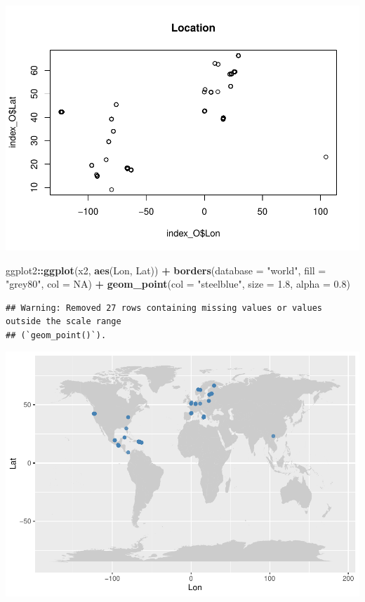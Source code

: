 \documentclass[
]{book}
\newenvironment{Shaded}{\begin{snugshade}}{\end{snugshade}}
\newcommand{\AttributeTok}[1]{\textcolor[rgb]{0.13,0.29,0.53}{#1}}
\newcommand{\ConstantTok}[1]{\textcolor[rgb]{0.56,0.35,0.01}{#1}}
\newcommand{\FloatTok}[1]{\textcolor[rgb]{0.00,0.00,0.81}{#1}}
\newcommand{\FunctionTok}[1]{\textcolor[rgb]{0.13,0.29,0.53}{\textbf{#1}}}
\newcommand{\NormalTok}[1]{#1}
\newcommand{\SpecialCharTok}[1]{\textcolor[rgb]{0.81,0.36,0.00}{\textbf{#1}}}
\newcommand{\StringTok}[1]{\textcolor[rgb]{0.31,0.60,0.02}{#1}}
\theoremstyle{definition}
\theoremstyle{definition}
\theoremstyle{definition}
\theoremstyle{definition}
\theoremstyle{remark}
\begin{document}
\includegraphics{Diagnostico_Poblacional_files/figure-latex/chap16_15-1.pdf}

\begin{Shaded}
\begin{Highlighting}[]
\NormalTok{ggplot2}\SpecialCharTok{::}\FunctionTok{ggplot}\NormalTok{(x2, }\FunctionTok{aes}\NormalTok{(Lon, Lat)) }\SpecialCharTok{+}
  \FunctionTok{borders}\NormalTok{(}\AttributeTok{database =} \StringTok{"world"}\NormalTok{, }\AttributeTok{fill =} \StringTok{"grey80"}\NormalTok{, }\AttributeTok{col =} \ConstantTok{NA}\NormalTok{) }\SpecialCharTok{+}
  \FunctionTok{geom\_point}\NormalTok{(}\AttributeTok{col =} \StringTok{"steelblue"}\NormalTok{, }\AttributeTok{size =} \FloatTok{1.8}\NormalTok{, }\AttributeTok{alpha =} \FloatTok{0.8}\NormalTok{)}
\end{Highlighting}
\end{Shaded}

\begin{verbatim}
## Warning: Removed 27 rows containing missing values or values outside the scale range
## (`geom_point()`).
\end{verbatim}

\includegraphics{Diagnostico_Poblacional_files/figure-latex/chap16_26-1.pdf}
\end{document}
